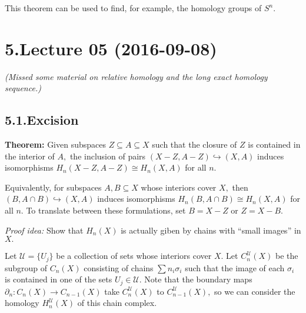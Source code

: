 \documentclass{article}
\begin{document}
This theorem can be used to find, for example, the homology groups of $S^n.$%

\section{5.\hspace*{0.5em}Lecture 05 (2016-09-08)}\label{sec-lecture-05-2016-09-08}%

\noindent{}\emph{(Missed some material on relative homology and the long exact homology sequence.)}%

\subsection{5.1.\hspace*{0.5em}Excision}\label{sec-excision}%

\noindent{}\textbf{Theorem:} Given subspaces $Z \subseteq A \subseteq X$ such that the closure of $Z$ is contained in the interior of $A,$ the inclusion of pairs $(X-Z, A-Z) \hookrightarrow (X,A)$ induces isomorphisms $H_n(X-Z, A-Z) \cong H_n(X,A)$ for all $n.$%

Equivalently, for subspaces $A,B \subseteq X$ whose interiors cover $X,$ then $(B, A \cap B) \hookrightarrow (X,A)$ induces isomorphisms $H_n(B, A \cap B) \cong H_n(X,A)$ for all $n.$ To translate between these formulations, set $B = X - Z$ or $Z = X - B.$%

\emph{Proof idea:} Show that $H_n(X)$ is actually giben by chains with \textquotedblleft{}small images\textquotedblright{} in $X.$%

Let $\mathcal{U} = \{U_j\}$ be a collection of sets whose interiors cover $X.$ Let $C_n^\mathcal{U}(X)$ be the subgroup of $C_n(X)$ consisting of chains $\sum n_i \sigma_i$ such that the image of each $\sigma_i$ is contained in one of the sets $U_j \in \mathcal{U}.$ Note that the boundary maps $\partial_n: C_n(X) \to C_{n-1}(X)$ take $C_n^\mathcal{U}(X)$ to $C_{n-1}^\mathcal{U}(X),$ so we can consider the homology $H_n^\mathcal{U}(X)$ of this chain complex.%
\end{document}
